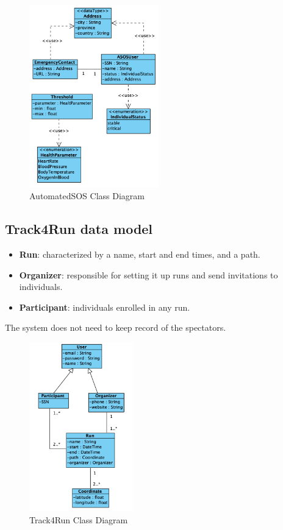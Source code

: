 \documentclass[a4paper, hidelinks, 12pt]{report}
\begin{document}
	\begin{figure}[H]
    		\centering
		\includegraphics[width=0.5\textwidth]{diagrams/asos_class_diagram.png}
		\caption[AutomatedSOS Class Diagram]{AutomatedSOS Class Diagram}
		\label{fig:AutomatedSOS Class Diagram}
	\end{figure}
	
	\subsection{Track4Run data model}
	\begin{itemize}
		\item{\textbf{Run}}:  characterized by a name, start and end times, and a path.
		\item{\textbf{Organizer}}: responsible for setting it up runs and send invitations to individuals.
		\item {\textbf{Participant}}: individuals enrolled in any run.
	\end{itemize}
	
	The system does not need to keep record of the spectators. \\
	
	\begin{figure}[H]
    		\centering
		\includegraphics[width=0.4\textwidth]{diagrams/t4r_class_diagram.png}
		\caption[Track4Run Class Diagram]{Track4Run Class Diagram}
		\label{fig:Track4Run Class Diagram}
	\end{figure}	
			
\end{document}
